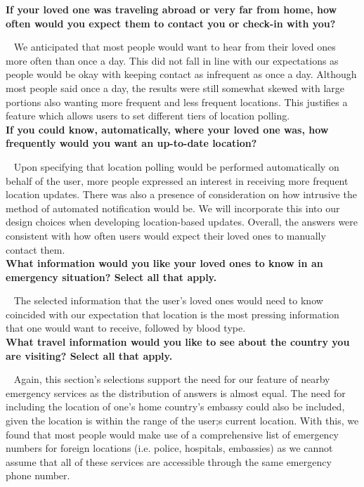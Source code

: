 \documentclass{scrreprt}
\begin{document}
\textbf{If your loved one was traveling abroad or very far from home, how often would you expect them to contact you or check-in with you?} 
\par ~ We anticipated that most people would want to hear from their loved ones more often than once a day. This did not fall in line with our expectations as people would be okay with keeping contact as infrequent as once a day. Although most people said once a day, the results were still somewhat skewed with large portions also wanting more frequent and less frequent locations. This justifies a feature which allows users to set different tiers of location polling. \\


\textbf{If you could know, automatically, where your loved one was, how frequently would you want an up-to-date location?}
\par ~ Upon specifying that location polling would be performed automatically on behalf of the user, more people expressed an interest in receiving more frequent location updates. There was also a presence of consideration on how intrusive the method of automated notification would be. We will incorporate this into our design choices when developing location-based updates. Overall, the answers were consistent with how often users would expect their loved ones to manually contact them. \\

\textbf{What information would you like your loved ones to know in an emergency situation? Select all that apply.}
\par ~ The selected information that the user's loved ones would need to know coincided with our expectation that location is the most pressing information that one would want to receive, followed by blood type. \\

\textbf{What travel information would you like to see about the country you are visiting? Select all that apply.}
\par ~ Again, this section's selections support the need for our feature of nearby emergency services as the distribution of answers is almost equal. The need for including the location of one's home country's embassy could also be included, given the location is within the range of the user;s current location. With this, we found that most people would make use of a comprehensive list of emergency numbers for foreign locations (i.e. police, hospitals, embassies) as we cannot assume that all of these services are accessible through the same emergency phone number. \\
\end{document}
